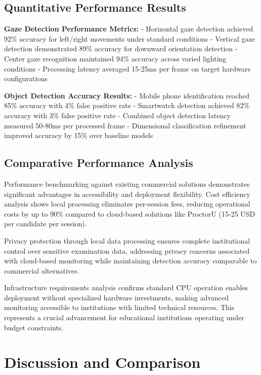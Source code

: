 \documentclass[conference]{IEEEtran}
\begin{document}
\subsection{Quantitative Performance Results}

\textbf{Gaze Detection Performance Metrics:}
- Horizontal gaze detection achieved 92\% accuracy for left/right movements under standard conditions
- Vertical gaze detection demonstrated 89\% accuracy for downward orientation detection
- Center gaze recognition maintained 94\% accuracy across varied lighting conditions
- Processing latency averaged 15-25ms per frame on target hardware configurations

\textbf{Object Detection Accuracy Results:}
- Mobile phone identification reached 85\% accuracy with 4\% false positive rate
- Smartwatch detection achieved 82\% accuracy with 3\% false positive rate
- Combined object detection latency measured 50-80ms per processed frame
- Dimensional classification refinement improved accuracy by 15\% over baseline models

\subsection{Comparative Performance Analysis}

Performance benchmarking against existing commercial solutions demonstrates significant advantages in accessibility and deployment flexibility\cite{proctoru}\cite{proctorio}\cite{respondus}. Cost efficiency analysis shows local processing eliminates per-session fees, reducing operational costs by up to 90\% compared to cloud-based solutions like ProctorU (15-25 USD per candidate per session).

Privacy protection through local data processing ensures complete institutional control over sensitive examination data, addressing privacy concerns associated with cloud-based monitoring while maintaining detection accuracy comparable to commercial alternatives.

Infrastructure requirements analysis confirms standard CPU operation enables deployment without specialized hardware investments, making advanced monitoring accessible to institutions with limited technical resources. This represents a crucial advancement for educational institutions operating under budget constraints\cite{pyqt5}.

\section{Discussion and Comparison}
\end{document}

